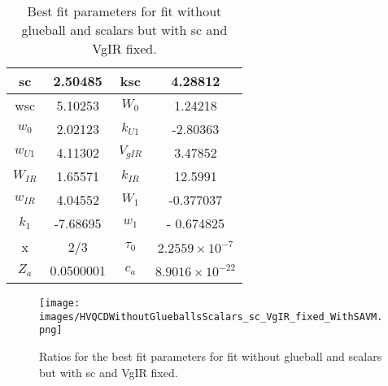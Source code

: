\documentclass[10 pt]{article}
\begin{document}
\begin{table}
\centering
\begin{tabular}{ | c | c | c | c |}
\hline
sc & 2.50485 & ksc & 4.28812 \\
\hline
wsc & 5.10253 & $W_0$ & 1.24218 \\
\hline
$w_0$ & 2.02123 & $k_{U1}$ & -2.80363  \\
\hline
$w_{U1}$ & 4.11302 & $V_{gIR}$ & 3.47852 \\
\hline
$W_{IR}$ & 1.65571 & $k_{IR}$ & 12.5991 \\
\hline
$w_{IR}$ & 4.04552 & $W_1$ & -0.377037 \\
\hline
$k_1$ & -7.68695 & $w_1$ & - 0.674825 \\
\hline
x & 2/3 & $\tau_0$ & $2.2559 \times 10^{-7}$\\
\hline
$Z_a$ & 0.0500001 & $c_a$ & $8.9016 \times 10^{-22}$ \\
\hline
\end{tabular}
\caption{Best fit parameters for fit without glueball and scalars but with sc and VgIR fixed.}
\label{table: fit without glueball scalars sc VgIR fixed} 
\end{table}



\begin{figure}
  \center
  \texttt{[image: images/HVQCDWithoutGlueballsScalars\_sc\_VgIR\_fixed\_WithSAVM.png]} 
  \caption{Ratios for the best fit parameters for fit without glueball and scalars but with sc and VgIR fixed.}
   \label{figure: fit without glueball scalars sc VgIR fixed}
\end{figure}
\end{document}

